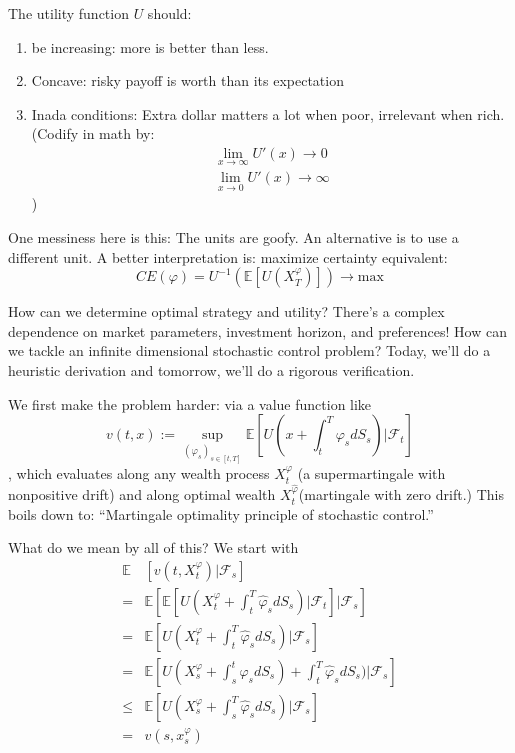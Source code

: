 The utility function $U$ should:
\begin{enumerate}
	\item be increasing: more is better than less.
	\item Concave: risky payoff is worth than its expectation
	\item Inada conditions: Extra dollar matters a lot when poor, irrelevant when rich. (Codify in math by:
	\begin{align}
		\lim_{x\to \infty} U'(x) \to 0\\
		\lim_{x\to 0} U'(x) \to \infty
	\end{align})
\end{enumerate}

One messiness here is this: The units are goofy. An alternative is to use a different unit.
A better interpretation is: maximize certainty equivalent:
\begin{equation}
	CE(\varphi) = U^{-1}(\mathbb{E}\left[ U(X_T^\varphi) \right]) \to \text{max}
\end{equation}

How can we determine optimal strategy and utility? There's a complex dependence on market parameters, investment horizon, and preferences! How can we tackle an infinite dimensional stochastic control problem? Today, we'll do a heuristic derivation and tomorrow, we'll do a rigorous verification.

We first make the problem harder: via a value function like
\begin{equation}
	v(t,x) := \sup_{(\varphi_s)_{s\in[t,T]}} \mathbb{E}\left[ U(x + \int_t^T \varphi_s dS_s) | \mathcal{F}_t\right]
\end{equation}, which evaluates along any wealth process $X_t^\varphi$ (a supermartingale with nonpositive drift) and along optimal wealth $X_t^{\hat{\varphi}}$(martingale with zero drift.) This boils down to: ``Martingale optimality principle of stochastic control.'' 

What do we mean by all of this? We start with
\begin{align}
	\mathbb{E}& \left[ v(t,X_t^\varphi) | \mathcal{F}_s \right] \\
	 =& \mathbb{E} \left[ \mathbb{E}\left[ U(X^\varphi_t + \int_t^T \hat{\varphi}_s dS_s) | \mathcal{F}_t\right] | \mathcal{F}_s \right] \\
	=& \mathbb{E} \left[ U(X^\varphi_t + \int_t^T \hat{\varphi}_s dS_s) | \mathcal{F}_s \right] \\
	=& \mathbb{E} \left[ U(X^\varphi_s + \int_s^t \hat{\varphi}_s dS_s)+ \int_t^T \hat{\varphi}_s dS_s) | \mathcal{F}_s \right] \\
	\leq& \mathbb{E} \left[ U(X^\varphi_s + \int_s^T \hat{\varphi}_s dS_s) | \mathcal{F}_s \right] \\
	=& v(s,x_s^\varphi)
\end{align}

